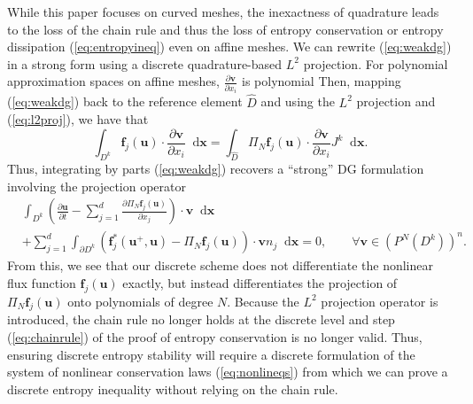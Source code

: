 \documentclass[preprint,10pt]{article}
\theoremstyle{definition}
\theoremstyle{lemma}
\theoremstyle{theorem}
\theoremstyle{assumption}
\renewcommand{\hat}{\widehat}
\newcommand{\pd}[2]{\frac{\partial#1}{\partial#2}}
\newcommand{\LRp}[1]{\left( #1 \right)}
\newcommand{\note}[1]{{\color{blue}{#1}}}
\newcommand{\lcwnote}[1]{{\color{magenta}{#1}}}
\newcommand*\diff[1]{\mathop{}\!{\mathrm{d}#1}} %
\begin{document}
While this paper focuses on curved meshes, the inexactness of quadrature leads to the loss of the chain rule and thus the loss of entropy conservation or entropy dissipation (\ref{eq:entropyineq}) even on affine meshes.  We can rewrite (\ref{eq:weakdg}) in a strong form using a discrete quadrature-based $L^2$ projection.  For polynomial approximation spaces on affine meshes, $\pd{\bm{v}}{x_i}$ is polynomial 
Then, mapping (\ref{eq:weakdg}) back to the reference element $\hat{D}$ and using the $L^2$ projection and (\ref{eq:l2proj}), we have that
\[
\int_{D^k} \bm{f}_j(\bm{u}) \cdot \pd{\bm{v}}{x_i} \diff{\bm{x}} = \int_{\hat{D}} \Pi_N \bm{f}_j(\bm{u}) \cdot \pd{\bm{v}}{x_i} J^k\diff{\bm{x}}.
\]
Thus, integrating by parts (\ref{eq:weakdg}) recovers a ``strong'' DG formulation involving the projection operator
\begin{align}
&\int_{D^k} \LRp{\pd{\bm{u}}{t} - \sum_{j=1}^d \pd{\Pi_N \bm{f}_j(\bm{u})}{x_j}} \cdot \bm{v} \diff{\bm{x}} \nonumber\\
&+ \sum_{j=1}^d \int_{\partial D^k} \LRp{\bm{f}^*_j\LRp{\bm{u}^+,\bm{u}} - \Pi_N\bm{f}_j(\bm{u})}\cdot \bm{v} n_j  \diff{\bm{x}} = 0, \qquad \forall \bm{v}\in \LRp{P^N\LRp{D^k}}^n.  
\label{eq:strongdg}
\end{align}
From this, we see that our discrete scheme does not differentiate the nonlinear flux function $\bm{f}_j\LRp{\bm{u}}$ exactly, but instead differentiates the projection of $\Pi_N \bm{f}_j\LRp{\bm{u}}$ onto polynomials of degree $N$.  Because the $L^2$ projection operator is introduced, the chain rule no longer holds at the discrete level and step (\ref{eq:chainrule}) of the proof of entropy conservation is no longer valid.  Thus, ensuring discrete entropy stability will require a discrete formulation of the system of nonlinear conservation laws (\ref{eq:nonlineqs}) from which we can prove a discrete entropy inequality without relying on the chain rule.  

\end{document}
